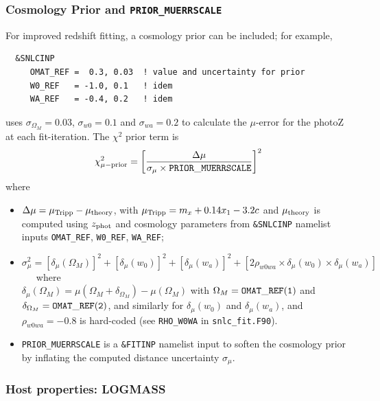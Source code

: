 \documentclass[12pt]{article}
\newcommand{\Zphot}{z_{\rm phot}}
\newcommand{\OM}{\Omega_M}
\begin{document}
   \subsubsection{Cosmology Prior and {\tt PRIOR\_MUERRSCALE}}
   \label{sss:zphot_cosmology_prior}

For improved redshift fitting, a cosmology prior can be included;
for example,
\begin{verbatim}
  &SNLCINP
     OMAT_REF =  0.3, 0.03  ! value and uncertainty for prior 
     W0_REF   = -1.0, 0.1   ! idem
     WA_REF   = -0.4, 0.2   ! idem
\end{verbatim}
% 
uses $\sigma_{\OM}=0.03$, $\sigma_{w0}=0.1$ and $\sigma_{wa}=0.2$ to calculate
the $\mu$-error for the photoZ at each fit-iteration. 
The $\chi^2$ prior term is
\begin{equation}
   \chi_{\mu{\rm -prior}}^2 = \left[ \frac{ \Delta\mu  }{ \sigma_{\mu} \times {\rm\tt PRIOR\_MUERRSCALE} } \right]^2
   \label{eq:chi2_muprior}
\end{equation}
%
where 
\newcommand{\muTripp}{\mu_{\rm Tripp}}
\newcommand{\muTheory}{\mu_{\rm theory}}
\newcommand{\rhowowa}{\rho_{w0wa}}
\begin{itemize}
  \item $\Delta\mu = \muTripp - \muTheory$, with $\muTripp = m_x + 0.14x_1 - 3.2c$ and 
    $\muTheory$ is computed using $\Zphot$ and cosmology parameters from
    {\tt \&SNLCINP} namelist inputs {\tt OMAT\_REF}, {\tt W0\_REF}, {\tt WA\_REF};
    \item $\sigma_\mu^2 = [\delta_{\mu}(\OM)]^2 + [\delta_{\mu}(w_0)]^2 + [\delta_{\mu}(w_a)]^2 
          + [ 2 \rhowowa \times \delta_{\mu}(w_0) \times \delta_{\mu}(w_a)] $ ~~~where \\
          $\delta_{\mu}(\OM) = \mu({\OM} +\delta_{\OM}) - \mu(\OM)$
          with $\OM = {\rm\tt OMAT\_REF(1)}$ and $\delta_{\OM} = {\rm\tt OMAT\_REF(2)}$,
          and similarly for $\delta_{\mu}(w_0)$ and $\delta_{\mu}(w_a)$,
          and $\rhowowa = -0.8$ is hard-coded (see {\tt RHO\_W0WA} in {\tt snlc\_fit.F90}).
    \item {\rm\tt PRIOR\_MUERRSCALE} is a {\tt \&FITINP} namelist input to soften the cosmology prior
      by inflating the computed distance uncertainty $\sigma_{\mu}$.
\end{itemize}


  \clearpage
   \subsubsection{Host properties: LOGMASS}
   \label{sss:zphot_logmass}
\end{document}
